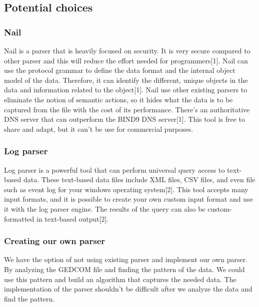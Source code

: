 \documentclass[onecolumn, draftclsnofoot, 10pt, compsoc]{IEEEtran}
\begin{document}
\subsection{Potential choices}

\subsubsection{Nail}
\begin{singlespace}
Nail is a parser that is heavily focused on security. It is very secure compared to other parser and this will reduce the effort needed for programmers[1]. Nail can use the protocol grammar to define the data format and the internal object model of the data. Therefore, it can identify the different, unique objects in the data and information related to the object[1]. Nail use other existing parsers to eliminate the notion of semantic actions, so it hides what the data is to be captured from the file with the cost of its performance. There's an authoritative DNS server that can outperform the BIND9 DNS server[1]. This tool is free to share and adapt, but it can't be use for commercial purposes. 
\end{singlespace}

\subsubsection{Log parser}
\begin{singlespace}
Log parser is a powerful tool that can perform universal query access to text-based data. These text-based data files include XML files, CSV files, and even file such as event log for your windows operating system[2]. This tool accepts many input formats, and it is possible to create your own custom input format and use it with the log parser engine. The results of the query can also be custom-formatted in text-based output[2].
\end{singlespace}
 

\subsubsection{Creating our own parser}
\begin{singlespace}
We have the option of not using existing parser and implement our own parser. By analyzing the GEDCOM file and finding the pattern of the data. We could use this pattern and build an algorithm that captures the needed data. The implementation of the parser shouldn't be difficult after we analyze the data and find the pattern.
\end{singlespace}
\end{document}
